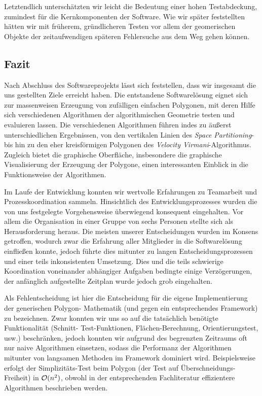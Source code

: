     Letztendlich unterschätzten wir leicht die Bedeutung einer hohen
    Testabdeckung, zumindest für die Kernkomponenten der Software. Wie wir
    später feststellten hätten wir mit früherem, gründlicheren Testen vor allem der
    geomerischen Objekte der zeitaufwendigen späteren Fehlersuche aus dem Weg gehen können. 

  \subsection{Fazit}

    Nach Abschluss des Softwareprojekts lässt sich feststellen, dass wir
    insgesamt die uns gestellten Ziele erreicht haben. Die entstandene
    Softwarelösung eignet sich zur massenweisen Erzeugung von zufälligen
    einfachen Polygonen, mit deren Hilfe sich verschiedenen Algorithmen der
    algorithmischen Geometrie testen und evaluieren lassen. Die verschiedenen
    Algorithmen führen indes zu äußerst unterschiedlichen Ergebnissen, von den
    vertikalen Linien des \emph{Space Partitioning}- bis hin zu den eher
    kreisförmigen Polygonen des \emph{Velocity Virmani}-Algorithmus. Zugleich
    bietet die graphische Oberfläche, insbesondere die graphische Visualisierung
    der Erzeugung der Polygone, einen interessanten Einblick in die
    Funktionsweise der Algorithmen.

    Im Laufe der Entwicklung konnten wir wertvolle Erfahrungen zu Teamarbeit und
    Prozesskoordination sammeln. Hinsichtlich des Entwicklungsprozesses wurden
    die von uns festgelegte Vorgehensweise überwiegend konsequent eingehalten.
    Vor allem die Organisation in einer Gruppe von sechs Personen stellte sich
    als Herausforderung heraus. Die meisten unserer Entscheidungen wurden im
    Konsens getroffen, wodurch zwar die Erfahrung aller Mitglieder in die
    Softwarelösung einfließen konnte, jedoch führte dies mitunter zu langen
    Entscheidungsprozessen und einer teils inkonsistenten Umsetzung. Dies und
    die teils schwierige Koordination voneinander abhängiger Aufgaben bedingte
    einige Verzögerungen, der anfänglich aufgestellte Zeitplan wurde jedoch grob
    eingehalten.

    Als Fehlentscheidung ist hier die Entscheidung für die eigene
    Implementierung der generischen Polygon- Mathematik (und gegen ein
    entsprechendes Framework) zu bezeichnen. Zwar konnten wir uns so auf die
    tatsächlich benötigte Funktionalität (Schnitt- Test-Funktionen,
    Flächen-Berechnung, Orientierungstest, usw.) beschränken, jedoch konnten wir
    aufgrund des begrenzten Zeitraums oft nur naive Algorithmen einsetzen,
    sodass die Performanz der Algorithmen mitunter von langsamen Methoden im
    Framework dominiert wird. Beispielsweise erfolgt der Simplizitäts-Test beim
    Polygon (der Test auf Überschneidungs-Freiheit) in $\mathcal{O}(n^2)$, obwohl in
    der entsprechenden Fachliteratur effizientere Algorithmen beschrieben
    werden.

